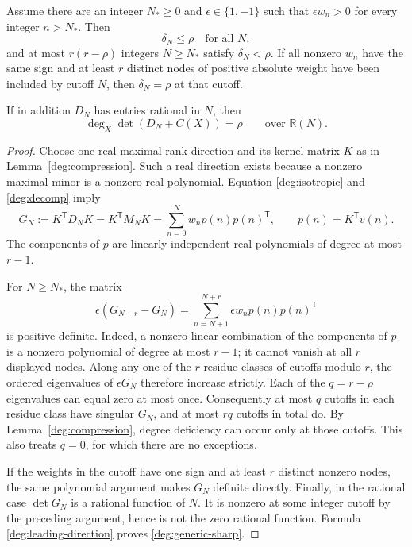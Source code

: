 \begin{theorem}
\label{deg:main}
Assume there are an integer $N_*\ge0$ and $\epsilon\in\{1,-1\}$ such
that $\epsilon w_n>0$ for every integer $n>N_*$.  Then
\[
 \delta_N\le\rho\quad\text{for all }N,
\]
and at most $r(r-\rho)$ integers $N\ge N_*$ satisfy
$\delta_N<\rho$.
If all nonzero $w_n$ have the same sign and at least $r$ distinct
nodes of positive absolute weight have been included by cutoff $N$,
then $\delta_N=\rho$ at that cutoff.

If in addition $D_N$ has entries rational in $N$, then
\begin{equation}\label{deg:generic-sharp}
 \deg_X\det(D_N+C(X))=\rho
 \qquad\text{over }\mathbb R(N).
\end{equation}
\end{theorem}
\begin{proof}
Choose one real maximal-rank direction and its kernel matrix $K$ as in
Lemma~\ref{deg:compression}.  Such a real direction exists because a
nonzero maximal minor is a nonzero real polynomial.  Equation
\eqref{deg:isotropic} and \eqref{deg:decomp} imply
\begin{equation}\label{deg:gram}
 G_N:=K^{\mathsf T}D_NK
 =K^{\mathsf T}M_NK
 =\sum_{n=0}^N w_n p(n)p(n)^{\mathsf T},
 \qquad p(n)=K^{\mathsf T}v(n).
\end{equation}
The components of $p$ are linearly independent real polynomials of
degree at most $r-1$.

For $N\ge N_*$, the matrix
\[
 \epsilon(G_{N+r}-G_N)
 =\sum_{n=N+1}^{N+r}\epsilon w_n p(n)p(n)^{\mathsf T}
\]
is positive definite.  Indeed, a nonzero linear combination of the
components of $p$ is a nonzero polynomial of degree at most $r-1$;
it cannot vanish at all $r$ displayed nodes.  Along any one of the
$r$ residue classes of cutoffs modulo $r$, the ordered eigenvalues of
$\epsilon G_N$ therefore increase strictly.  Each of the $q=r-\rho$
eigenvalues can equal zero at most once.  Consequently at most $q$
cutoffs in each residue class have singular $G_N$, and at most $rq$
cutoffs in total do.  By Lemma~\ref{deg:compression}, degree deficiency
can occur only at those cutoffs.  This also treats $q=0$, for which
there are no exceptions.

If the weights in the cutoff have one sign and at least $r$ distinct
nonzero nodes, the same polynomial argument makes $G_N$ definite
directly.  Finally, in the rational case $\det G_N$ is a rational
function of $N$.  It is nonzero at some integer cutoff by the preceding
argument, hence is not the zero rational function.  Formula
\eqref{deg:leading-direction} proves \eqref{deg:generic-sharp}.
\end{proof}

